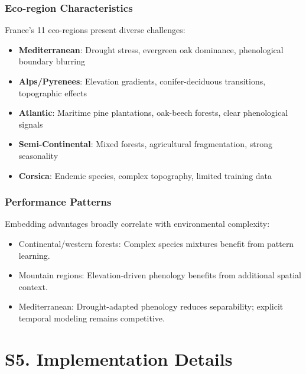 \documentclass[utf8]{frontiers_suppmat}
\begin{document}
\subsubsection{Eco-region Characteristics}
France's 11 eco-regions present diverse challenges:
\begin{itemize}
    \item \textbf{Mediterranean}: Drought stress, evergreen oak dominance, phenological boundary blurring
    \item \textbf{Alps/Pyrenees}: Elevation gradients, conifer-deciduous transitions, topographic effects
    \item \textbf{Atlantic}: Maritime pine plantations, oak-beech forests, clear phenological signals
    \item \textbf{Semi-Continental}: Mixed forests, agricultural fragmentation, strong seasonality
    \item \textbf{Corsica}: Endemic species, complex topography, limited training data
\end{itemize}

\subsubsection{Performance Patterns}
Embedding advantages broadly correlate with environmental complexity:
\begin{itemize}
    \item Continental/western forests: Complex species mixtures benefit from pattern learning.
    \item Mountain regions: Elevation-driven phenology benefits from additional spatial context.
    \item Mediterranean: Drought-adapted phenology reduces separability; explicit temporal modeling remains competitive.
\end{itemize}

\section{S5. Implementation Details}
\end{document}
